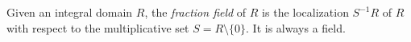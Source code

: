 \documentclass{article}
\begin{document}
Given an integral domain $R$, the {\em fraction field} of $R$ is the localization $S^{-1} R$ of $R$ with respect to the multiplicative set $S = R \setminus \{0\}$. It is always a field.
\end{document}
